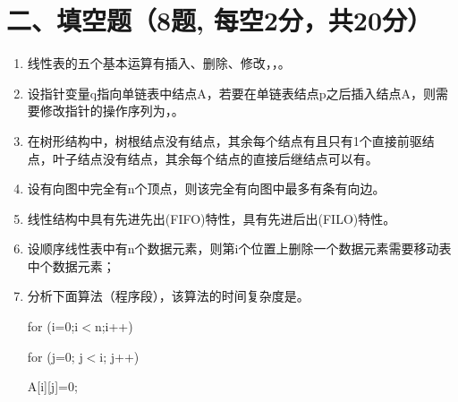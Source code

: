 \documentclass{../../note}
\begin{document}
\vspace{1cm}


\section*{二、填空题（8题, 每空2分，共20分）}

\begin{enumerate}
\item 线性表的五个基本运算有插入、删除、修改，\underline{\hspace{2cm}}，\underline{\hspace{2cm}}。

\item 设指针变量q指向单链表中结点A，若要在单链表结点p之后插入结点A，则需要修改指针的操作序列为\underline{\hspace{2cm}}，\underline{\hspace{2cm}}。

\item 在树形结构中，树根结点没有\underline{\hspace{2cm}}结点，其余每个结点有且只有1个直接前驱结点，叶子结点没有\underline{\hspace{2cm}}结点，其余每个结点的直接后继结点可以有\underline{\hspace{2cm}}。

\item 设有向图中完全有n个顶点，则该完全有向图中最多有\underline{\hspace{2cm}}条有向边。

\item 线性结构中\underline{\hspace{2cm}}具有先进先出(FIFO)特性，\underline{\hspace{2cm}}具有先进后出(FILO)特性。

\item 设顺序线性表中有n个数据元素，则第i个位置上删除一个数据元素需要移动表中\underline{\hspace{2cm}}个数据元素；

\item 分析下面算法（程序段），该算法的时间复杂度是\underline{\hspace{2cm}}。

for (i=0;i$<$n;i++)

\hspace{1cm}for (j=0; j$<$i; j++)

\hspace{2cm}A[i][j]=0;
\end{enumerate}
\end{document}
